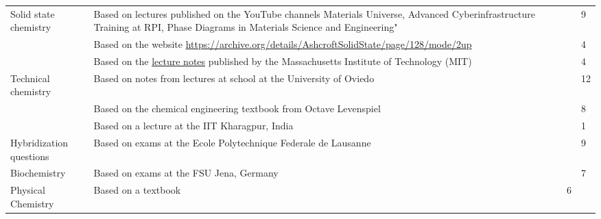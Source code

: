 \begin{xltabular}{\textwidth}{p{3.5 cm}p{6.5 cm}p{.5cm}X}
\midrule
Solid state chemistry & Based on lectures published on the YouTube channels Materials Universe, Advanced Cyberinfrastructure Training at RPI, Phase Diagrams in Materials Science and Engineering" && 9\\
                    & Based on the website \href{Wayback Machine}{https://archive.org/details/AshcroftSolidState/page/128/mode/2up} && 4\\
                    & Based on the \href{https://ocw.mit.edu/courses/3-091sc-introduction-to-solid-state-chemistry-fall-2010/pages/organic-materials/29-polymers-synthesis-properties-applications/}{lecture notes} published by the Massachusetts Institute of Technology (MIT) && 4\\
Technical chemistry & Based on notes from lectures at school at the University of Oviedo && 12\\
                    & Based on the chemical engineering textbook from Octave Levenspiel && 8\\
                    & Based on a lecture at the IIT Kharagpur, India && 1\\
\midrule
Hybridization questions &  Based on exams at the Ecole Polytechnique Federale de Lausanne && 9\\
\midrule
Biochemistry & Based on exams at the FSU Jena, Germany && 7\\
\midrule
Physical Chemistry & Based on a textbook & 6\\
\bottomrule
\end{xltabular}
